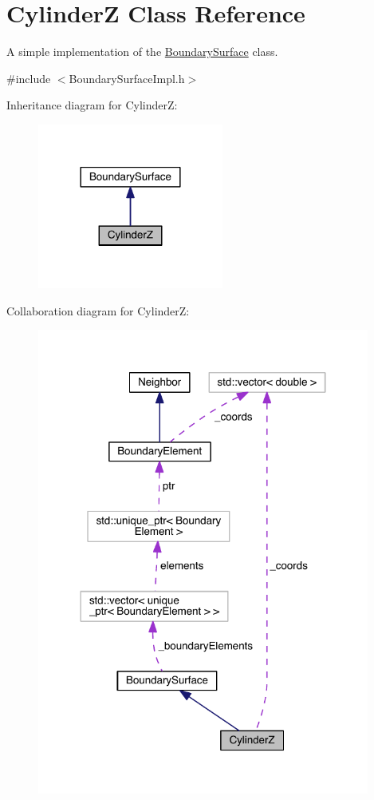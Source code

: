 \hypertarget{classCylinderZ}{\section{Cylinder\+Z Class Reference}
\label{classCylinderZ}
}


A simple implementation of the \hyperlink{classBoundarySurface}{Boundary\+Surface} class.  




{\ttfamily \#include $<$Boundary\+Surface\+Impl.\+h$>$}



Inheritance diagram for Cylinder\+Z\+:\nopagebreak
\begin{figure}[H]
\begin{center}
\leavevmode
\includegraphics[width=173pt]{classCylinderZ__inherit__graph}
\end{center}
\end{figure}


Collaboration diagram for Cylinder\+Z\+:
\nopagebreak
\begin{figure}[H]
\begin{center}
\leavevmode
\includegraphics[width=310pt]{classCylinderZ__coll__graph}
\end{center}
\end{figure}
